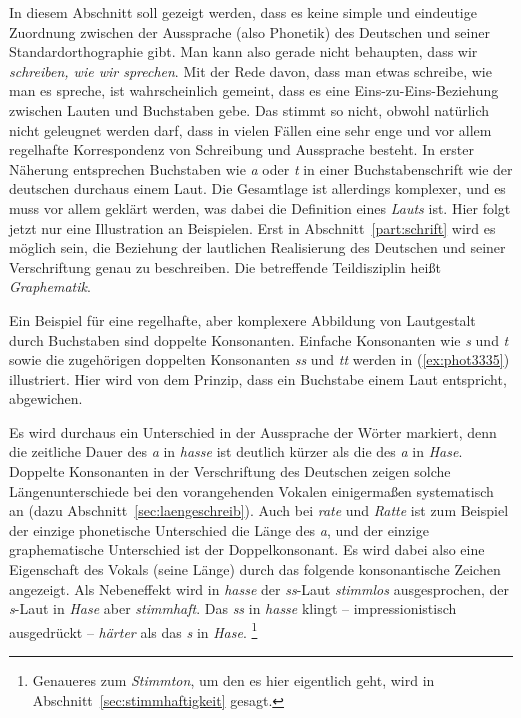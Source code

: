 \label{sec:orthographiegraphematik}


In diesem Abschnitt soll gezeigt werden, dass es keine simple und eindeutige Zuordnung zwischen der Aussprache (also Phonetik) des Deutschen und seiner Standardorthographie gibt.
Man kann also gerade nicht behaupten, dass wir \textit{schreiben, wie wir sprechen}.
Mit der Rede davon, dass man etwas schreibe, wie man es spreche, ist wahrscheinlich gemeint, dass es eine Eins-zu-Eins-Beziehung zwischen Lauten und Buchstaben gebe. 
Das stimmt so nicht, obwohl natürlich nicht geleugnet werden darf, dass in vielen Fällen eine sehr enge und vor allem regelhafte Korrespondenz von Schreibung und Aussprache besteht.
In erster Näherung entsprechen Buchstaben wie \textit{a} oder \textit{t} in einer Buchstabenschrift wie der deutschen durchaus einem Laut. 
Die Gesamtlage ist allerdings komplexer, und es muss vor allem geklärt werden, was dabei die Definition eines \textit{Lauts} ist.
Hier folgt jetzt nur eine Illustration an Beispielen.
Erst in Abschnitt~\ref{part:schrift} wird es möglich sein, die Beziehung der lautlichen Realisierung des Deutschen und seiner Verschriftung genau zu beschreiben.
Die betreffende Teildisziplin heißt \textit{Graphematik}.

Ein Beispiel für eine regelhafte, aber komplexere Abbildung von Lautgestalt durch Buchstaben sind doppelte Konsonanten.
Einfache Konsonanten wie \textit{s} und \textit{t} sowie die zugehörigen doppelten Konsonanten \textit{ss} und \textit{tt} werden in (\ref{ex:phot3335}) illustriert.
Hier wird von dem Prinzip, dass ein Buchstabe einem Laut entspricht, abgewichen.

\begin{exe}
  \ex\label{ex:phot3335}
  \begin{xlist}
  \end{xlist}
\end{exe}

Es wird durchaus ein Unterschied in der Aussprache der Wörter markiert, denn die zeitliche Dauer des \textit{a} in \textit{hasse} ist deutlich kürzer als die des \textit{a} in \textit{Hase}.
Doppelte Konsonanten in der Verschriftung des Deutschen zeigen solche Längenunterschiede bei den vorangehenden Vokalen einigermaßen systematisch an (dazu Abschnitt~\ref{sec:laengeschreib}).
Auch bei \textit{rate} und \textit{Ratte} ist zum Beispiel der einzige phonetische Unterschied die Länge des \textit{a}, und der einzige graphematische Unterschied ist der Doppelkonsonant.
Es wird dabei also eine Eigenschaft des Vokals (seine Länge) durch das folgende konsonantische Zeichen angezeigt.
Als Nebeneffekt wird in \textit{hasse} der \textit{ss}-Laut \textit{stimmlos} ausgesprochen, der \textit{s}-Laut in \textit{Hase} aber \textit{stimmhaft}.
Das \textit{ss} in \textit{hasse} klingt -- impressionistisch ausgedrückt -- \textit{härter} als das \textit{s} in \textit{Hase}.%
\footnote{Genaueres zum \textit{Stimmton}, um den es hier eigentlich geht, wird in Abschnitt~\ref{sec:stimmhaftigkeit} gesagt.}

